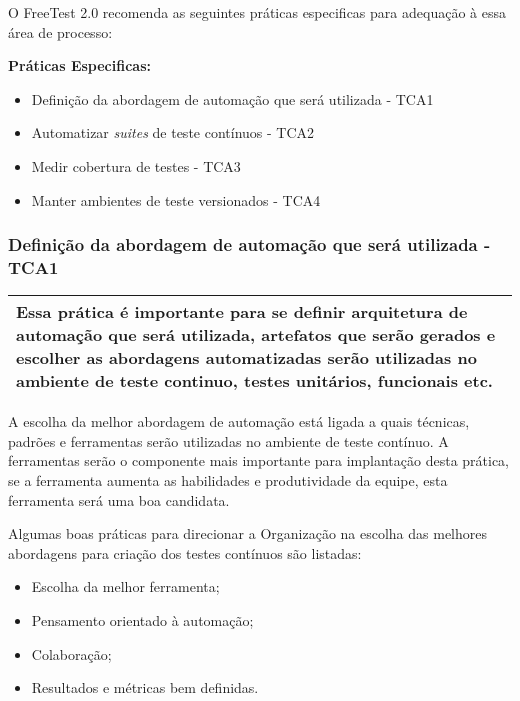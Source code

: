 O FreeTest 2.0 recomenda as seguintes práticas especificas para adequação à essa área de processo:

\textbf{Práticas Especificas:}

\begin{itemize}    
    \item Definição da abordagem de automação que será utilizada - TCA1
    \item Automatizar \textit{suites} de teste contínuos - TCA2
    \item Medir cobertura de testes - TCA3
    \item Manter ambientes de teste versionados - TCA4
\end{itemize}

\subsubsection{Definição da abordagem de automação que será utilizada - TCA1}
\label{sec:tca1}

\begin{table}[H]
\centering
\begin{tabular}{|p{130mm}|}
\hline
Essa prática é importante para se definir arquitetura de automação que será utilizada, artefatos que serão gerados e escolher as abordagens automatizadas serão utilizadas no ambiente de teste continuo, testes unitários, funcionais etc. \\ 
\hline
\end{tabular}
\end{table}

A escolha da melhor abordagem de automação está ligada a quais técnicas, padrões e ferramentas serão utilizadas no ambiente de teste contínuo. A ferramentas serão o componente mais importante para implantação desta prática, se a ferramenta aumenta as habilidades e produtividade da equipe, esta ferramenta será uma boa candidata.

Algumas boas práticas para direcionar a Organização na escolha das melhores abordagens para criação dos testes contínuos são listadas:

\begin{itemize}
	\item Escolha da melhor ferramenta;
	\item Pensamento orientado à automação;
	\item Colaboração;
	\item Resultados e métricas bem definidas.
\end{itemize}


